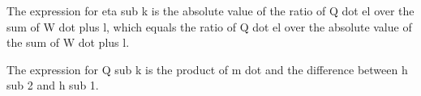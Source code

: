 The expression for eta sub k is the absolute value of the ratio of Q dot el over the sum of W dot plus l, which equals the ratio of Q dot el over the absolute value of the sum of W dot plus l.

The expression for Q sub k is the product of m dot and the difference between h sub 2 and h sub 1.